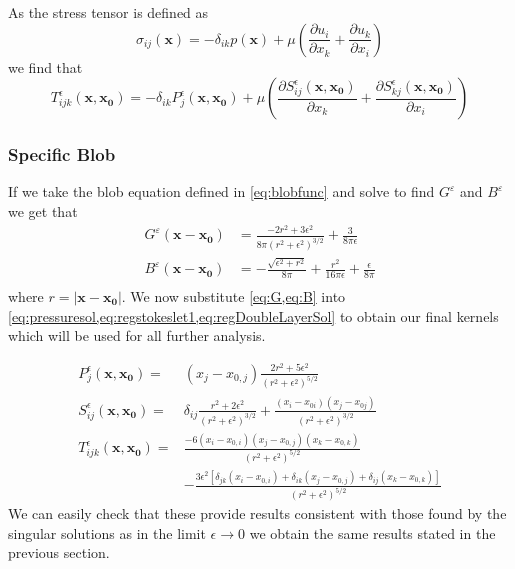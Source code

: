 As the stress tensor is defined as 
\begin{equation*}
    \sigma_{ij}(\mathbf{x}) = -\delta_{ik}p(\mathbf{x}) + \mu\left( \frac{\partial u_i}{\partial x_k} + \frac{\partial u_k}{\partial x_i} \right)
\end{equation*}
we find that 
\begin{equation}
\label{eq:regDoubleLayerSol}
    T^\epsilon_{ijk}(\mathbf{x},\mathbf{x_0}) = -\delta_{ik} P^\epsilon_j(\mathbf{x},\mathbf{x_0}) + \mu\left( \frac{\partial S^\epsilon_{ij}(\mathbf{x},\mathbf{x_0})}{\partial x_k} + \frac{\partial S^\epsilon_{kj}(\mathbf{x},\mathbf{x_0})}{\partial x_i}\right)
\end{equation}

\subsubsection{Specific Blob}
If we take the blob equation defined in \cref{eq:blobfunc} and solve to find $G^\varepsilon$ and $B^\varepsilon$ we get that
\begin{subequations}
\begin{align}
    G^\varepsilon(\mathbf{x}-\mathbf{x_0}) &= \frac{-2r^2+3\epsilon^2}{8\pi(r^2+\epsilon^2)^{3/2}} + \frac{3}{8\pi\epsilon} \label{eq:G}\\
    B^\varepsilon(\mathbf{x}-\mathbf{x_0}) &= -\frac{\sqrt{\epsilon^2+r^2}}{8\pi} + \frac{r^2}{16\pi\epsilon} + \frac{\epsilon}{8\pi}\label{eq:B}\\\
\end{align}
\end{subequations}
where $r=|\mathbf{x}-\mathbf{x_0}|$. We now substitute \cref{eq:G,eq:B} into \cref{eq:pressuresol,eq:regstokeslet1,eq:regDoubleLayerSol} to obtain our final kernels which will be used for all further analysis.

\begin{subequations}
\begin{align}
    P_j^\epsilon(\mathbf{x}, \mathbf{x_0}) =& (x_j-x_{0,j})\frac{2r^2+5\epsilon^2}{(r^2+\epsilon^2)^{5/2}} \label{eq:pressuresol2}\\
    S_{ij}^\epsilon(\mathbf{x}, \mathbf{x_0}) =& \delta_{ij} \frac{r^2+2\epsilon^2}{\left( r^2 + \epsilon^2 \right)^{3/2}} + \frac{(x_i-x_{0i})(x_j-x_{0j})}{\left( r^2 + \epsilon^2 \right)^{3/2}} \label{eq:regstokeslet2} \\ 
    T_{ijk}^\epsilon(\mathbf{x}, \mathbf{x_0}) =& \frac{-6(x_i-x_{0,i})(x_j-x_{0,j})(x_k-x_{0,k})}{(r^2+\epsilon^2)^{5/2}} \label{eq:doublelayer2}\\
    &-\frac{3\epsilon^2[\delta_{jk}(x_i-x_{0,i}) +\delta_{ik}(x_j-x_{0,j})+\delta_{ij}(x_k-x_{0,k})]}{(r^2+\epsilon^2)^{5/2}} \nonumber
\end{align}
\end{subequations}
We can easily check that these provide results consistent with those found by the singular solutions as in the limit $\epsilon \to 0$ we obtain the same results stated in the previous section.


